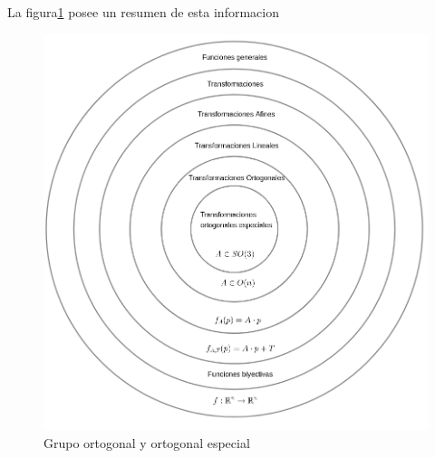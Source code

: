 La figura\ref{fig:t} posee un resumen de esta informacion
\begin{figure}[!ht]
  \centering
  \includegraphics[scale=0.3]{rsc/trans}
  \caption{Grupo ortogonal y ortogonal especial}\label{fig:t}
\end{figure}
